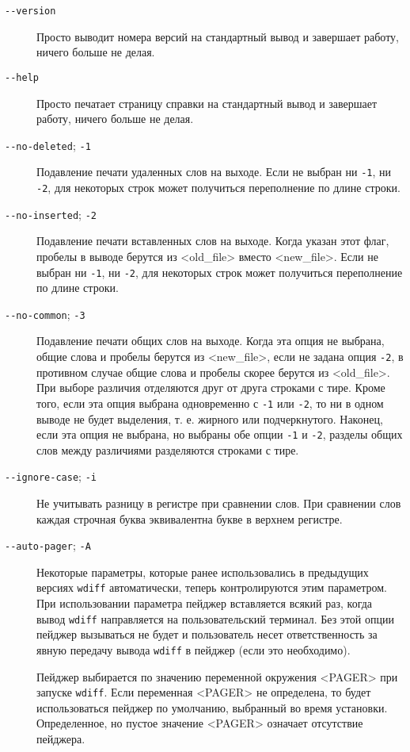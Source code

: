 \begin{description}
\item[\texttt{-\/-version}]
Просто выводит номера версий на стандартный вывод и завершает работу,
ничего больше не делая.
\item[\texttt{-\/-help}]
Просто печатает страницу справки на стандартный вывод и завершает
работу, ничего больше не делая.
\item[\texttt{-\/-no-deleted}; \texttt{-1}]
Подавление печати удаленных слов на выходе. Если не выбран ни
\texttt{-1}, ни \texttt{-2}, для некоторых строк может получиться
переполнение по длине строки.
\item[\texttt{-\/-no-inserted}; \texttt{-2}]
Подавление печати вставленных слов на выходе. Когда указан этот флаг,
пробелы в выводе берутся из \textless old\_file\textgreater{} вместо
\textless new\_file\textgreater. Если не выбран ни \texttt{-1}, ни
\texttt{-2}, для некоторых строк может получиться переполнение по длине
строки.
\item[\texttt{-\/-no-common}; \texttt{-3}]
Подавление печати общих слов на выходе. Когда эта опция не выбрана,
общие слова и пробелы берутся из \textless new\_file\textgreater, если
не задана опция \texttt{-2}, в противном случае общие слова и пробелы
скорее берутся из \textless old\_file\textgreater. При выборе различия
отделяются друг от друга строками с тире. Кроме того, если эта опция
выбрана одновременно с \texttt{-1} или \texttt{-2}, то ни в одном выводе
не будет выделения, т. е. жирного или подчеркнутого. Наконец, если эта
опция не выбрана, но выбраны обе опции \texttt{-1} и \texttt{-2},
разделы общих слов между различиями разделяются строками с тире.
\item[\texttt{-\/-ignore-case}; \texttt{-i}]
Не учитывать разницу в регистре при сравнении слов. При сравнении слов
каждая строчная буква эквивалентна букве в верхнем регистре.
\item[\texttt{-\/-auto-pager}; \texttt{-A}]
Некоторые параметры, которые ранее использовались в предыдущих версиях
\texttt{wdiff} автоматически, теперь контролируются этим параметром. При
использовании параметра пейджер вставляется всякий раз, когда вывод
\texttt{wdiff} направляется на пользовательский терминал. Без этой опции
пейджер вызываться не будет и пользователь несет ответственность за
явную передачу вывода \texttt{wdiff} в пейджер (если это необходимо).

Пейджер выбирается по значению переменной окружения
\textless PAGER\textgreater{} при запуске \texttt{wdiff}. Если
переменная \textless PAGER\textgreater{} не определена, то будет
использоваться пейджер по умолчанию, выбранный во время установки.
Определенное, но пустое значение \textless PAGER\textgreater{} означает
отсутствие пейджера.


\end{description}
